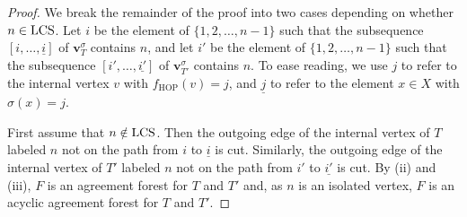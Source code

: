 \documentclass{article}
\newcommand{\HOP}{\mathrm{HOP}}
\begin{document}
\begin{proof}
We break the remainder of the proof into two cases depending on whether $n\in {\rm LCS}$. Let $i$ be the element of $\{1,2, \ldots, n-1\}$ such that the subsequence $ [i,\ldots, \underline{i}]$ of $\mathbf{v}_T^\sigma$ contains $n$, and let $i'$ be the element of $\{1,2, \ldots, n-1\}$ such that the subsequence $[i', \ldots, \underline{i'}]$ of $\mathbf{v}_{T'}^\sigma$ contains $n$. To ease reading, we use $j$ to refer to the internal vertex $v$ with $f_\HOP(v)=j$, and $\underline{j}$ to refer to the element $x \in X$ with $\sigma(x)=j$.

First assume that $n\notin {\rm LCS}$. Then the outgoing edge of the internal vertex of $T$ labeled $n$ not on the path from $i$ to $\underline{i}$ is cut. Similarly, the outgoing edge of the internal vertex of $T'$ labeled $n$ not on the path from $i'$ to $\underline{i'}$ is cut. By (ii) and (iii), $F$ is an agreement forest for $T$ and $T'$ and, as $n$ is an isolated vertex, $F$ is an acyclic agreement forest for $T$ and $T'$. 


\end{proof}
\end{document}
